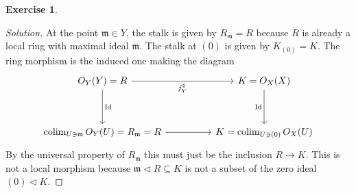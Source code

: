 \documentclass{article}
\renewcommand{\qedsymbol}{\raisebox{-0.5cm}{}}
\newcommand{\maxid}{\mathfrak{m}}
\DeclareMathOperator{\Id}{Id}
\DeclareMathOperator{\colim}{colim}
\newcommand{\ideal}{\triangleleft}
\newenvironment{solution}{\begin{proof}[Solution]\renewcommand\qedsymbol{}}{\end{proof}}
\theoremstyle{definition}
\newtheorem{question}{Exercise}
\begin{document}
\begin{question}
\begin{enumerate}[(i)]
\begin{solution}
                  At the point \(\maxid\in Y\), the stalk is given by
                  \(R_{\maxid}=R\) because \(R\) is already a local ring with
                  maximal ideal \(\maxid\). The stalk at \((0)\) is given by
                  \(K_{(0)}=K\). The ring morphism is the induced one making the
                  diagram
                  \[
                      \begin{tikzcd}[ampersand replacement=\&]
                          {O_{Y}(Y)=R} \&\& {K=O_{X}(X)} \\
                          \\
                          {\colim_{U\ni\maxid} O_{Y}(U)=R_{\maxid}=R} \&\& K={\colim_{U\ni(0)} O_{X}(U)}
                          \arrow[from=3-1, to=3-3]
                          \arrow["\Id", from=1-1, to=3-1]
                          \arrow["{f^{\sharp}_{Y}}"', from=1-1, to=1-3]
                          \arrow["\Id"', from=1-3, to=3-3]
                      \end{tikzcd}
                  \]
                  By the universal property of \(R_{\maxid}\) this must just be
                  the inclusion \(R\to K\). This is not a local morphism because
                  \(\maxid\ideal R\subseteq K\) is not a subset of the zero
                  ideal \((0)\ideal K\).
              \end{solution}
    \end{enumerate}
\end{question}
\end{document}
